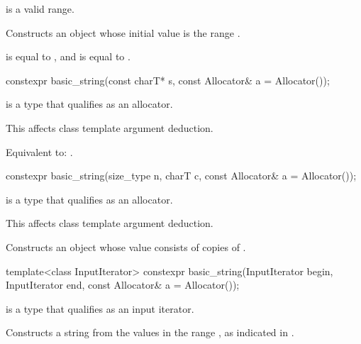 \begin{itemdescr}
\pnum
\expects
{} is a valid range.

\pnum
\effects
Constructs an object whose initial value is the range .

\pnum
\ensures
{} is equal to , and
 is equal to .
\end{itemdescr}

%
\begin{itemdecl}
constexpr basic_string(const charT* s, const Allocator& a = Allocator());
\end{itemdecl}

\begin{itemdescr}
\pnum
\constraints
{} is a type
that qualifies as an allocator.
\begin{note}
This affects class template argument deduction.
\end{note}

\pnum
\effects
Equivalent to: .
\end{itemdescr}

%
\begin{itemdecl}
constexpr basic_string(size_type n, charT c, const Allocator& a = Allocator());
\end{itemdecl}

\begin{itemdescr}
\pnum
\constraints
{} is a type
that qualifies as an allocator.
\begin{note}
This affects class template argument deduction.
\end{note}

\pnum
\effects
Constructs an object whose value consists of  copies of .
\end{itemdescr}

%
\begin{itemdecl}
template<class InputIterator>
  constexpr basic_string(InputIterator begin, InputIterator end, const Allocator& a = Allocator());
\end{itemdecl}

\begin{itemdescr}
\pnum
\constraints
{} is a type that qualifies as an input
iterator.

\pnum
\effects
Constructs a string from the values in the range ,
as indicated in .
\end{itemdescr}

